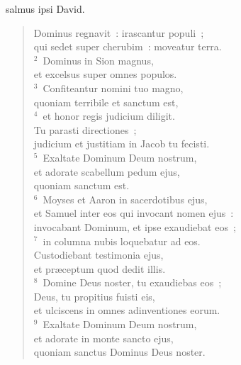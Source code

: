 \bchapter
{}salmus ipsi David. \begin{flushleft}\begin{verse}\vspace{6pt}Dominus regnavit~: irascantur populi~;\\ qui sedet super cherubim~: moveatur terra.\\
${}^{2}$~Dominus in Sion magnus,\\ et excelsus super omnes populos.\\
${}^{3}$~Confiteantur nomini tuo magno,\\ quoniam terribile et sanctum est,\\
${}^{4}$~et honor regis judicium diligit.\\ Tu parasti directiones~;\\ judicium et justitiam in Jacob tu fecisti.\\
${}^{5}$~Exaltate Dominum Deum nostrum,\\ et adorate scabellum pedum ejus,\\ quoniam sanctum est.\\
${}^{6}$~Moyses et Aaron in sacerdotibus ejus,\\ et Samuel inter eos qui invocant nomen ejus~:\\ invocabant Dominum, et ipse exaudiebat eos~;\\
${}^{7}$~in columna nubis loquebatur ad eos.\\ Custodiebant testimonia ejus,\\ et pr\ae ceptum quod dedit illis.\\
${}^{8}$~Domine Deus noster, tu exaudiebas eos~;\\ Deus, tu propitius fuisti eis,\\ et ulciscens in omnes adinventiones eorum.\\
${}^{9}$~Exaltate Dominum Deum nostrum,\\ et adorate in monte sancto ejus,\\ quoniam sanctus Dominus Deus noster.\end{verse}\end{flushleft}



